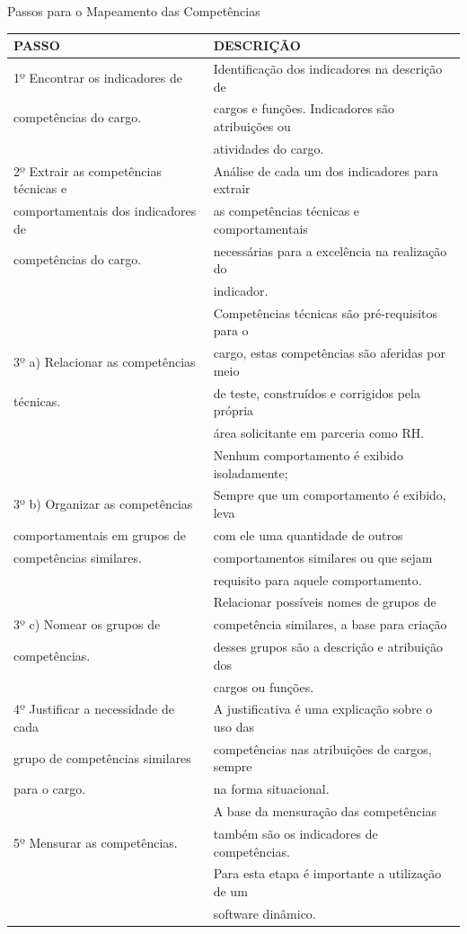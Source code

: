 \begin{quadro}[htbp]
	\centering
	\caption{Passos para o Mapeamento das Competências}
	\label{tab:passo_mapeamento}
	\begin{tabular}{|l|l|} \hline

		\hline
		PASSO & DESCRIÇÃO\\
		\hline
		1º Encontrar os indicadores de  & Identificação dos indicadores na descrição de \\
		competências do cargo. & cargos e funções. Indicadores são atribuições ou \\
		& atividades do cargo. \\
		\hline
		2º Extrair as competências técnicas e  & Análise de cada um dos indicadores para extrair \\
		comportamentais dos indicadores de & as competências técnicas e comportamentais \\
		competências do cargo. & necessárias para a excelência na realização do \\
		& indicador.\\
		\hline
		& Competências técnicas são pré-requisitos para o  \\
		3º a) Relacionar as competências & cargo, estas competências são aferidas por meio \\ técnicas.
		& de teste, construídos e corrigidos pela própria \\
		& área solicitante em parceria como RH.\\
		\hline
		& Nenhum comportamento é exibido isoladamente;\\
		3º b) Organizar as competências & Sempre que um comportamento é exibido, leva \\
		comportamentais em grupos de & com ele uma quantidade de outros \\
		competências similares. & comportamentos similares ou que sejam \\
		& requisito para aquele comportamento.\\
		\hline
		& Relacionar possíveis nomes de grupos de \\
		3º c) Nomear os grupos de &  competência similares, a base para criação  \\ competências.
		& desses grupos são a descrição e atribuição dos  \\
		& cargos ou funções. \\
		\hline
		4º Justificar a necessidade de cada & A justificativa é uma explicação sobre o uso das \\
		grupo de competências similares & competências nas atribuições de cargos, sempre \\  para o cargo.
		& na forma situacional.\\
		\hline
		& A base da mensuração das competências  \\
		5º Mensurar as competências.   & também são os indicadores de competências.  \\
		& Para esta etapa é importante a utilização de um \\
		& software dinâmico.


\end{tabular}
\end{quadro}
